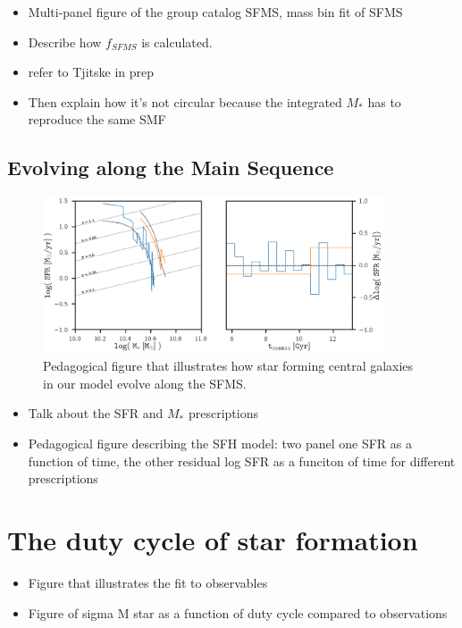 \documentclass[12pt, letterpaper, preprint]{aastex}
\newcommand{\bitem}{\begin{itemize}}
\newcommand{\eitem}{\end{itemize}}
\begin{document}
\begin{itemize}
    \item Multi-panel figure of the group catalog SFMS, mass bin fit of SFMS 
    \item Describe how $f_{SFMS}$ is calculated. 
    \item refer to Tjitske in prep 
    \item Then explain how it's not circular because the integrated $M_*$ has to reproduce the same SMF
\end{itemize}

\subsection{Evolving along the Main Sequence} 
\begin{figure}
\begin{center}
\includegraphics[width=0.9\textwidth]{figs/sfh_pedagogical.png}
\caption{Pedagogical figure that illustrates how star forming central galaxies in our model
evolve along the SFMS.}
\label{fig:sfh_model}
\end{center}
\end{figure}
\begin{itemize}
    \item Talk about the SFR and $M_*$ prescriptions 
    \item Pedagogical figure describing the SFH model: two panel one SFR as a function of time, the other residual log SFR as a funciton of time for different prescriptions
\end{itemize}

\section{The duty cycle of star formation}
\bitem
\item Figure that illustrates the fit to observables 
\item Figure of sigma M star as a function of duty cycle compared to observations 
\eitem 
\end{document}
